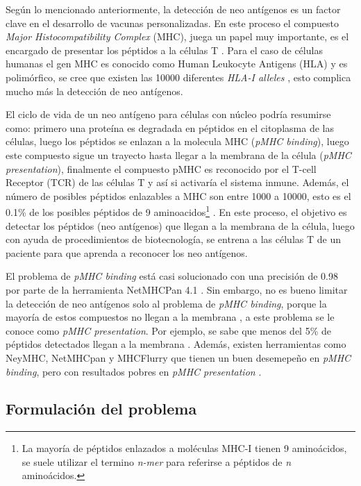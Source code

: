 Según lo mencionado anteriormente, la detección de neo antígenos es un factor clave en el desarrollo de vacunas personalizadas. En este proceso el compuesto \textit{Major Histocompatibility Complex} (MHC), juega un papel muy importante, es el encargado de presentar los péptidos a la células T \citep{hashemi2022improved}. Para el caso de células humanas el gen MHC es conocido como Human Leukocyte Antigens (HLA) y es polimórfico, se cree que existen las 10000 diferentes \textit{HLA-I alleles} \citep{abelin2017mass}, esto complica mucho más la detección de neo antígenos. 

El ciclo de vida de un neo antígeno para células con núcleo podría resumirse como: primero una proteína es degradada en péptidos en el citoplasma de las células, luego los péptidos se enlazan a la molecula MHC (\textit{pMHC binding}), luego este compuesto sigue un trayecto hasta llegar a la membrana de la célula (\textit{pMHC presentation}), finalmente el compuesto pMHC es reconocido por  el T-cell Receptor (TCR) de las células T y así si activaría el sistema inmune. Además, el número de posibles péptidos enlazables a MHC  son entre 1000 a 10000, esto es el 0.1\% de los posibles péptidos  de 9 aminoacidos\footnote{La mayoría de péptidos enlazados a moléculas MHC-I tienen 9 aminoácidos, se suele utilizar el termino \textit{n-mer} para referirse a péptidos de \textit{n} aminoácidos.} \citep{abelin2017mass}. En este proceso, el objetivo es detectar los péptidos (neo antígenos) que llegan a la membrana de la célula, luego con ayuda de procedimientos de biotecnología, se entrena a las células T de un paciente para que aprenda a reconocer los neo antígenos.


El problema de \textit{pMHC binding} está casi solucionado con una precisión de 0.98 por parte de la herramienta NetMHCPan 4.1 \citep{reynisson2020netmhcpan}. Sin embargo, no es bueno limitar la detección de neo antígenos solo al problema de \textit{pMHC binding}, porque la mayoría de estos compuestos no llegan a la membrana \citep{mill2022neoms}, a este problema se le conoce como \textit{pMHC presentation}. Por ejemplo, se sabe que menos del 5\% de péptidos detectados llegan a la membrana \citep{de2020neoantigen, mill2022neoms, bulik2019deep, bassani2015mass, yadav2014predicting}. Además, existen herramientas como NeyMHC, NetMHCpan y MHCFlurry que tienen un buen desemepeño en \textit{pMHC binding}, pero con resultados pobres en  \textit{pMHC presentation} \citep{bulik2019deep}. 


\subsection{Formulación del problema}

